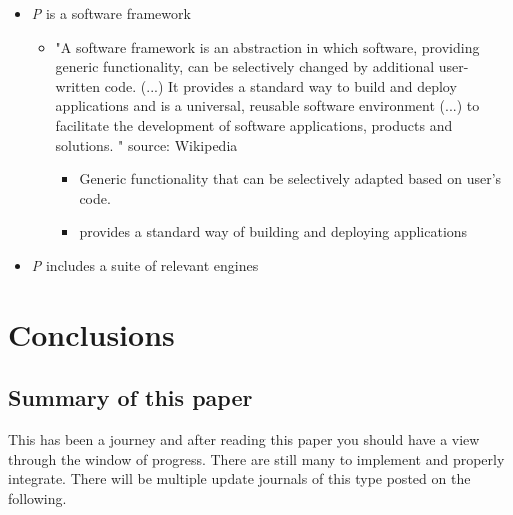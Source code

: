     \begin{itemize}
        \item \emph{P} is a software framework
        \begin{itemize}
          \item {"A software framework is an abstraction in which software, providing generic functionality, can be selectively changed by additional user-written code. 
            (...) 
            It provides a standard way to build and deploy applications and is a universal, reusable software environment 
            (...)
            to facilitate the development of software applications, products and solutions. "} source: Wikipedia

            \begin{itemize}
                \item Generic functionality that can be selectively adapted based on user's code.
                \item provides a standard way of building and deploying applications
            \end{itemize}
        \end{itemize}
        \item \emph{P} includes a suite of relevant engines
    \end{itemize}



\chapter{Conclusions}
    
    \section{Summary of this paper}
        This has been a journey and after reading this paper you should have a view through the window of progress. There are still many to implement and properly integrate. There will be multiple update journals of this type posted on the following.

